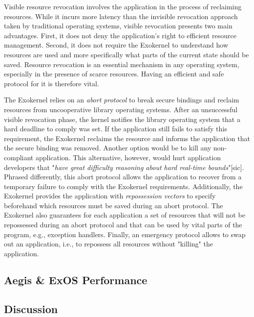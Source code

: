 Visible resource revocation involves the application in the process of reclaiming resources.
While it incurs more latency than the invisible revocation approach taken by traditional operating systems, visible revocation presents two main advantages.
First, it does not deny the application's right to efficient resource management.
Second, it does not require the Exokernel to understand how resources are used and more specifically what parts of the current state should be saved.
Resource revocation is an essential mechanism in any operating system, especially in the presence of scarce resources.
Having an efficient and safe protocol for it is therefore vital.

The Exokernel relies on an \emph{abort protocol} to break secure bindings and reclaim resources from uncooperative library operating systems.
After an unsuccessful visible revocation phase, the kernel notifies the library operating system that a hard deadline to comply was set.
If the application still fails to satisfy this requirement, the Exokernel reclaims the resource and informs the application that the secure binding was removed.
Another option would be to kill any non-compliant application.
This alternative, however, would hurt application developers that "\textit{have great difficulty reasoning about hard real-time bounds}"[sic].
Phrased differently, this abort protocol allows the application to recover from a temporary failure to comply with the Exokernel requirements.
Additionally, the Exokernel provides the application with \emph{repossession vectors} to specify beforehand which resources must be saved during an abort protocol.
The Exokernel also guarantees for each application a set of resources that will not be repossessed during an abort protocol and that can be used by vital parts of the program, e.g., exception handlers.
Finally, an emergency protocol allows to swap out an application, i.e., to repossess all resources without "killing" the application.

\subsection{Aegis \& ExOS Performance}



\subsection{Discussion}




